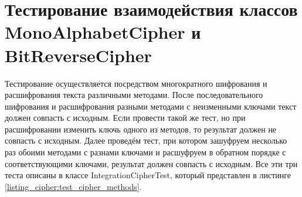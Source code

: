 \documentclass[a4paper,12pt]{article}
\begin{document}
\newpage\section{Тестирование взаимодействия классов \\MonoAlphabetCipher и BitReverseCipher}
Тестирование осуществляется посредством многократного шифрования и расшифрования текста различными методами. После последовательного шифрования и расшифрования разными методами с неизменными ключами текст должен совпасть с исходным. Если провести такой же тест, но при расшифровании изменить ключь одного из методов, то результат должен не совпасть с исходным. Далее проведём тест, при котором зашуфруем несколько раз обоими методами с разнами ключами и расшуфруем в обратном порядке с соответствующими ключами, результат должен совпасть с исходным. Все эти три теста описаны в классе IntegrationCipherTest, который представлен в листинге \ref{listing_cipher:test_cipher_methods}.
\end{document}
